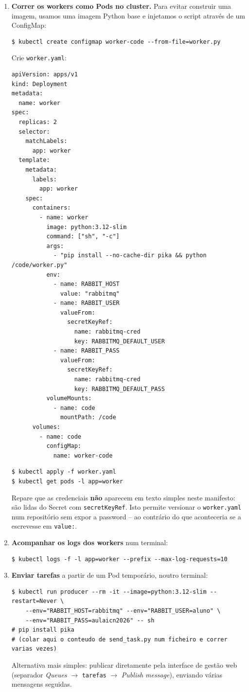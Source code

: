 \documentclass[11pt,a4paper]{article}
\begin{document}
\begin{enumerate}[label=\arabic*.,resume]
  \item \textbf{Correr os workers como Pods no cluster.} Para evitar construir uma imagem, usamos uma imagem Python base e injetamos o script através de um ConfigMap:
\begin{lstlisting}
$ kubectl create configmap worker-code --from-file=worker.py
\end{lstlisting}
  Crie \texttt{worker.yaml}:
\begin{lstlisting}
apiVersion: apps/v1
kind: Deployment
metadata:
  name: worker
spec:
  replicas: 2
  selector:
    matchLabels:
      app: worker
  template:
    metadata:
      labels:
        app: worker
    spec:
      containers:
        - name: worker
          image: python:3.12-slim
          command: ["sh", "-c"]
          args:
            - "pip install --no-cache-dir pika && python /code/worker.py"
          env:
            - name: RABBIT_HOST
              value: "rabbitmq"
            - name: RABBIT_USER
              valueFrom:
                secretKeyRef:
                  name: rabbitmq-cred
                  key: RABBITMQ_DEFAULT_USER
            - name: RABBIT_PASS
              valueFrom:
                secretKeyRef:
                  name: rabbitmq-cred
                  key: RABBITMQ_DEFAULT_PASS
          volumeMounts:
            - name: code
              mountPath: /code
      volumes:
        - name: code
          configMap:
            name: worker-code
\end{lstlisting}
\begin{lstlisting}
$ kubectl apply -f worker.yaml
$ kubectl get pods -l app=worker
\end{lstlisting}
  Repare que as credenciais \textbf{não} aparecem em texto simples neste manifesto: são lidas do Secret com \texttt{secretKeyRef}. Isto permite versionar o \texttt{worker.yaml} num repositório sem expor a password -- ao contrário do que aconteceria se a escrevesse em \texttt{value:}.

  \item \textbf{Acompanhar os logs dos workers} num terminal:
\begin{lstlisting}
$ kubectl logs -f -l app=worker --prefix --max-log-requests=10
\end{lstlisting}

  \item \textbf{Enviar tarefas} a partir de um Pod temporário, noutro terminal:
\begin{lstlisting}
$ kubectl run producer --rm -it --image=python:3.12-slim --restart=Never \
    --env="RABBIT_HOST=rabbitmq" --env="RABBIT_USER=aluno" \
    --env="RABBIT_PASS=aulaicn2026" -- sh
# pip install pika
# (colar aqui o conteudo de send_task.py num ficheiro e correr varias vezes)
\end{lstlisting}
  Alternativa mais simples: publicar diretamente pela interface de gestão web (separador \emph{Queues} $\rightarrow$ \texttt{tarefas} $\rightarrow$ \emph{Publish message}), enviando várias mensagens seguidas.


\end{enumerate}
\end{document}
